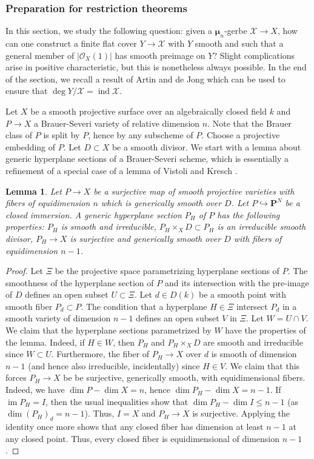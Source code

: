 \documentclass[11pt]{amsart}
\newcommand{\field}[1]{\mathbf #1}
\newcommand{\ms}[1]{\mathscr #1}
\renewcommand{\P}{\field P}
\newcommand{\m}{\boldsymbol{\mu}}
\DeclareMathOperator{\ind}{ind}
\renewcommand{\[}{[\!\hspace{0.03em}[}
\renewcommand{\]}{]\!\hspace{0.03em}]}
\renewcommand{\(}{(\!\hspace{0.03em}(}
\renewcommand{\)}{)\!\hspace{0.03em})}
\newcommand{\im}{\operatorname{im}}
\newcommand{\inj}{\hookrightarrow}
\newtheorem{lem}{Lemma}[subsubsection]%
\theoremstyle{definition}
\theoremstyle{remark}
\begin{document}
\subsubsection{Preparation for restriction theorems}\label{S:preparation}

In this section, we study the following question: given a 
$\m_{n}$-gerbe $\ms X\to X$, how can one construct a finite flat cover 
$Y\to\ms X$ with $Y$ smooth and such that a general member of 
$|{\ms O}_{X}(1)|$ has smooth preimage on $Y$?  Slight complications 
arise in positive characteristic, but this is nonetheless always 
possible.  In the end of the section, we recall a result of Artin and 
de Jong which can be used to ensure that $\deg Y/\ms X=\ind\ms X$.

Let $X$ be a smooth projective surface over an algebraically closed 
field $k$ and $P\to X$ a Brauer-Severi 
variety of relative dimension $n$.  Note that the Brauer class of $P$ 
is split by $P$, hence by any subscheme of $P$.  Choose a projective 
embedding of $P$.  Let $D\subset X$ be a smooth divisor.  We start 
with a lemma about generic hyperplane sections of a Brauer-Severi 
scheme, which is essentially a 
refinement of a special case of a lemma of Vistoli and 
Kresch \cite{vistoli-kresch}.

\begin{lem}\label{L:cut me down} Let $P\to X$ be a surjective map of smooth 
projective varieties with fibers of equidimension $n$ which is 
generically smooth over $D$.  Let $P\inj\P^{N}$ be a closed 
immersion.  A generic hyperplane section $P_{H}$ of $P$ has the 
following properties: $P_{H}$ is smooth and irreducible, $P_{H}\times_{X}D\subset 
P_{H}$ is an irreducible smooth divisor, $P_{H}\to X$ is surjective and 
generically smooth over $D$ with fibers of 
equidimension $n-1$.
\end{lem}
\begin{proof} Let $\Xi$ be the projective space parametrizing hyperplane sections 
of $P$.  The smoothness of the hyperplane section of $P$ and its 
intersection with the pre-image of $D$ defines an open subset 
$U\subset\Xi$.  Let 
$d\in D(k)$ be a smooth point with smooth fiber $P_{d}\subset P$.  The 
condition that a hyperplane $H\in\Xi$ intersect $P_{d}$ in a smooth 
variety of dimension $n-1$ defines an open subset $V$ in $\Xi$. Let 
$W=U\cap V$.  We claim that the hyperplane sections parametrized by 
$W$ have the properties of the lemma.  Indeed, if $H\in W$, then 
$P_{H}$ and $P_{H}\times_{X}D$ are smooth and irreducible since 
$W\subset U$.  Furthermore, the fiber of $P_{H}\to X$ over $d$ is 
smooth of dimension $n-1$ (and hence also irreducible, incidentally) 
since $H\in V$.  We claim that this forces $P_{H}\to X$ be be 
surjective, generically smooth, with equidimensional fibers.  Indeed, 
we have $\dim P-\dim X=n$, hence $\dim P_{H}-\dim X=n-1$.  If $\im 
P_{H}=I$, then the usual inequalities \cite[\S15]{matsumura} show that 
$\dim P_{H}-\dim I\leq n-1$ (as $\dim (P_{H})_{d}=n-1$).  Thus, $I=X$ 
and $P_{H}\to X$ is surjective.  Applying the identity once more 
shows that any closed fiber has dimension at least $n-1$ at any closed 
point.  Thus, every closed fiber is equidimensional of dimension $n-1$.
\end{proof}
\end{document}
